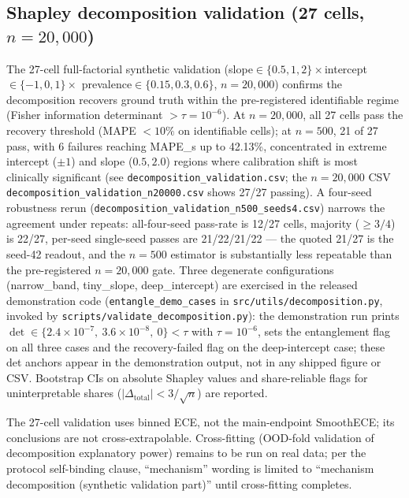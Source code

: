 \documentclass[final,5p,times,nonatbib]{elsarticle}
\begin{document}
\subsection{Shapley decomposition validation (27 cells, $n=20{,}000$)}
\label{sec:shapley}
The 27-cell full-factorial synthetic validation
(slope$\in\{0.5,1,2\}\times$intercept$\in\{-1,0,1\}\times$
prevalence$\in\{0.15,0.3,0.6\}$, $n=20{,}000$) confirms the
decomposition recovers ground truth within the pre-registered
identifiable regime (Fisher information determinant $>\tau=10^{-6}$).
At $n=20{,}000$, all 27 cells pass the recovery threshold (MAPE
$<10\%$ on identifiable cells); at $n=500$, 21 of 27 pass, with 6
failures reaching MAPE\_s up to 42.13\%, concentrated in extreme
intercept ($\pm 1$) and slope ($0.5, 2.0$) regions where calibration
shift is most clinically significant (see
\texttt{decomposition\_validation.csv}; the $n=20{,}000$ CSV
\texttt{decomposition\_validation\_}\allowbreak\texttt{n20000.csv}
shows 27/27 passing). A four-seed robustness rerun
(\texttt{decomposition\_validation\_n500\_seeds4.csv}) narrows the
agreement under repeats: all-four-seed pass-rate is 12/27 cells,
majority ($\geq 3/4$) is 22/27, per-seed single-seed passes are
21/22/21/22 --- the quoted 21/27 is the seed-42 readout, and the
$n=500$ estimator is substantially less repeatable than the
pre-registered $n=20{,}000$ gate. Three degenerate configurations
(narrow\_band, tiny\_slope, deep\_intercept) are exercised in the
released demonstration code (\texttt{entangle\_demo\_cases} in
\texttt{src/utils/decomposition.py}, invoked by
\texttt{scripts/validate\_decomposition.py}): the demonstration run
prints $\det\in\{2.4\times10^{-7},\ 3.6\times10^{-8},\ 0\}<\tau$ with
$\tau=10^{-6}$, sets the entanglement flag on all three cases and the
recovery-failed flag on the deep-intercept case; these det anchors
appear in the demonstration output, not in any shipped figure or CSV.
Bootstrap CIs on absolute Shapley values and share-reliable
flags for uninterpretable shares ($|\Delta_{\text{total}}|<3/\sqrt{n}$)
are reported.

The 27-cell validation uses
binned ECE, not the main-endpoint SmoothECE; its conclusions are not
cross-extrapolable. Cross-fitting (OOD-fold validation of
decomposition explanatory power) remains to be run on real data; per
the protocol self-binding clause, ``mechanism'' wording is limited to
``mechanism decomposition (synthetic validation part)'' until
cross-fitting completes.
\end{document}
